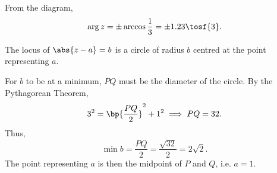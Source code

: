\begin{solution}
\begin{center}
    \end{center}

    From the diagram, \[\arg{z} = \pm \arccos \frac13 = \pm 1.23 \tosf{3}.\]

    The locus of $\abs{z - a} = b$ is a circle of radius $b$ centred at the point representing $a$.

    For $b$ to be at a minimum, $PQ$ must be the diameter of the circle. By the Pythagorean Theorem, \[3^2 = \bp{\frac{PQ}{2}}^2 + 1^2 \implies PQ = 32.\] Thus, \[\min b = \frac{PQ}{2} = \frac{\sqrt{32}}{2} = 2\sqrt{2}.\] The point representing $a$ is then the midpoint of $P$ and $Q$, i.e. $a = 1$.
\end{solution}

